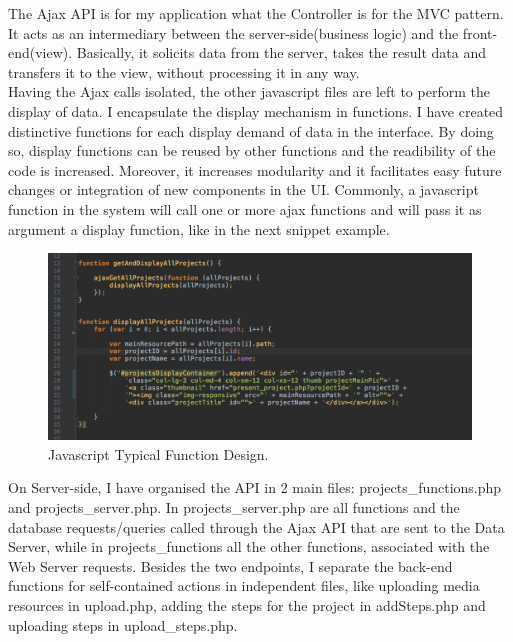 The Ajax API is for my application what the Controller is for the MVC pattern. It acts as an intermediary between the server-side(business logic) and the front-end(view). Basically, it solicits data from the server, takes the result data and transfers it to the view, without processing it in any way.\\  

Having the Ajax calls isolated, the other javascript files are left to perform the display of data. I encapsulate the display mechanism in functions. 
I have created distinctive functions for each display demand of data in the interface. By doing so, display functions can be reused by other functions and the readibility of the code is increased. Moreover, it increases modularity and it facilitates easy future changes or integration of new components in the UI.
Commonly, a javascript function in the system will call one or more ajax functions and will pass it as argument a display function, like in the next snippet example.\\ 

\begin{figure}
\includegraphics[width=1\linewidth]{images/JavascriptFunction.png}
\caption{Javascript Typical Function Design.}
\label{fig:javascript_function}
\end{figure}

On Server-side, I have organised the API in 2 main files: projects\_functions.php and projects\_server.php. In projects\_server.php are all functions and the database requests/queries called through the Ajax API that are sent to the Data Server, while in projects\_functions all the other functions, associated with the Web Server requests.
Besides the two endpoints, I separate the back-end functions for self-contained actions in independent files, like uploading media resources in upload.php, adding the steps for the project in addSteps.php and uploading steps in upload\_steps.php.\\


